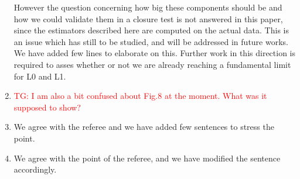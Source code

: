 \documentclass[11pt,a4paper]{article}
\numberwithin{equation}{section}
\numberwithin{figure}{section}
\numberwithin{table}{section}
\begin{document}
\begin{enumerate}
    However the question concerning how big these components should be and how we could validate them 
    in a closure test is not answered in this paper, since the estimators described here 
    are computed on the actual data.
    This is an issue which has still to be studied, and will be addressed in future works.
    We have added few lines to elaborate on this. Further work in this direction is required to 
    asses whether or not we are already reaching a fundamental limit for L0 and L1.  
    \item \textcolor{red}{TG: I am also a bit confused about Fig.8 at the moment. What was it supposed to show?}
    \item We agree with the referee and we have added few sentences to stress the point.
    \item We agree with the point of the referee, and we have modified the sentence accordingly.
\end{enumerate}







\end{document}

